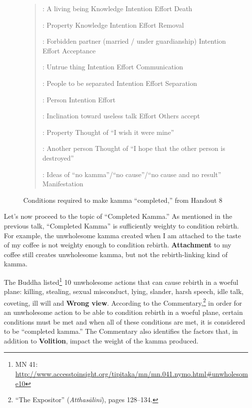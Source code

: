 \begin{figure}[H]

\begin{quote}

:  A living being  Knowledge  Intention  Effort  Death

:  Property  Knowledge  Intention  Effort  Removal

:  Forbidden partner (married / under guardianship)  Intention  Effort  Acceptance

:  Untrue thing  Intention  Effort  Communication

:  People to be separated  Intention  Effort  Separation

:  Person  Intention  Effort

:  Inclination toward useless talk  Effort  Others accept 

:  Property  Thought of “I wish it were mine”

:  Another person  Thought of “I hope that the other person is destroyed”

:  Ideas of “no kamma”/“no cause”/“no cause and no result”  Manifestation

\end{quote}

\caption{Conditions required to make kamma “completed,” from Handout 8}
\label{fig:Completed}
\end{figure}

Let’s now proceed to the topic of “Completed Kamma.” As mentioned in the previous talk, “Completed Kamma” is sufficiently weighty to condition rebirth. For example, the unwholesome kamma created when I am attached to the taste of my coffee is not weighty enough to condition rebirth. \textbf{Attachment} to my coffee still creates unwholesome kamma, but not the rebirth-linking kind of kamma.

The Buddha listed\footnote{MN 41: \url{http://www.accesstoinsight.org/tipitaka/mn/mn.041.nymo.html\#unwholesome10}} 10 unwholesome actions that can cause rebirth in a woeful plane: killing, stealing, sexual misconduct, lying, slander, harsh speech, idle talk, coveting, ill will and \textbf{Wrong view}. According to the Commentary,\footnote{“The Expositor” (\textit{Atthasālinī}), pages 128--134.} in order for an unwholesome action to be able to condition rebirth in a woeful plane, certain conditions must be met and when all of these conditions are met, it is considered to be “completed kamma.” The Commentary also identifies the factors that, in addition to \textbf{Volition}, impact the weight of the kamma produced. 

